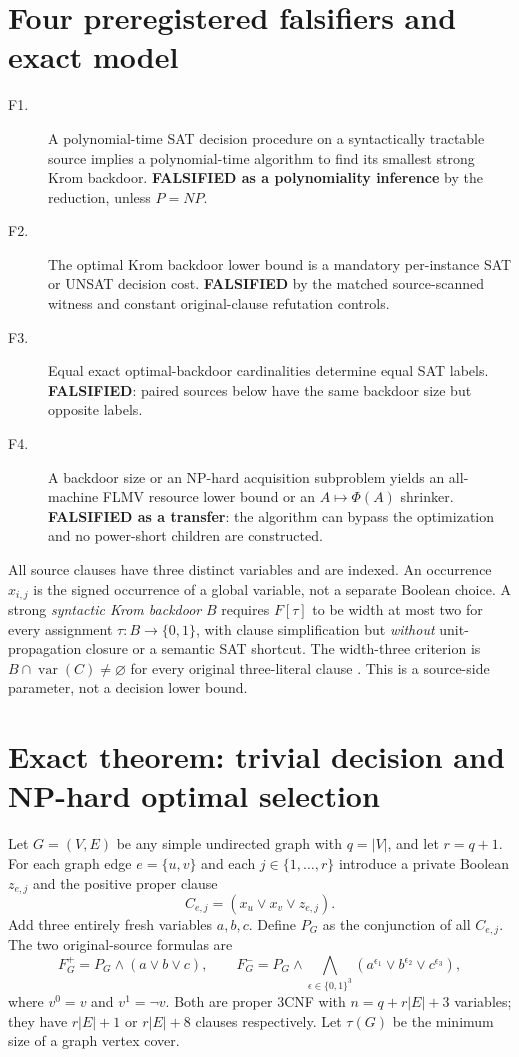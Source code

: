 \documentclass[11pt]{article}
\begin{document}
\section*{Four preregistered falsifiers and exact model}
\begin{description}
\item[F1.] A polynomial-time SAT decision procedure on a syntactically tractable source implies a polynomial-time algorithm to find its smallest strong Krom backdoor. \textbf{FALSIFIED as a polynomiality inference} by the reduction, unless $P=NP$.
\item[F2.] The optimal Krom backdoor lower bound is a mandatory per-instance SAT or UNSAT decision cost. \textbf{FALSIFIED} by the matched source-scanned witness and constant original-clause refutation controls.
\item[F3.] Equal exact optimal-backdoor cardinalities determine equal SAT labels. \textbf{FALSIFIED}: paired sources below have the same backdoor size but opposite labels.
\item[F4.] A backdoor size or an NP-hard acquisition subproblem yields an all-machine FLMV resource lower bound or an $A\mapsto\Phi(A)$ shrinker. \textbf{FALSIFIED as a transfer}: the algorithm can bypass the optimization and no power-short children are constructed.
\end{description}
All source clauses have three distinct variables and are indexed. An occurrence $x_{i,j}$ is the signed occurrence of a global variable, not a separate Boolean choice. A strong \emph{syntactic Krom backdoor} $B$ requires $F[\tau]$ to be width at most two for every assignment $\tau:B\to\{0,1\}$, with clause simplification but \emph{without} unit-propagation closure or a semantic SAT shortcut. The width-three criterion is $B\cap\operatorname{var}(C)\ne\varnothing$ for every original three-literal clause \cite{dreier2024}. This is a source-side parameter, not a decision lower bound.

\section*{Exact theorem: trivial decision and NP-hard optimal selection}
Let $G=(V,E)$ be any simple undirected graph with $q=|V|$, and let $r=q+1$. For each graph edge $e=\{u,v\}$ and each $j\in\{1,\ldots,r\}$ introduce a private Boolean $z_{e,j}$ and the positive proper clause
\[
 C_{e,j}=(x_u\lor x_v\lor z_{e,j}).
\]
Add three entirely fresh variables $a,b,c$. Define $P_G$ as the conjunction of all $C_{e,j}$. The two original-source formulas are
\[
 F_G^+=P_G\land(a\lor b\lor c),\qquad
 F_G^-=P_G\land\bigwedge_{\epsilon\in\{0,1\}^3}
 (a^{\epsilon_1}\lor b^{\epsilon_2}\lor c^{\epsilon_3}),
\]
where $v^0=v$ and $v^1=\neg v$. Both are proper 3CNF with $n=q+r|E|+3$ variables; they have $r|E|+1$ or $r|E|+8$ clauses respectively. Let $\tau(G)$ be the minimum size of a graph vertex cover.
\end{document}
